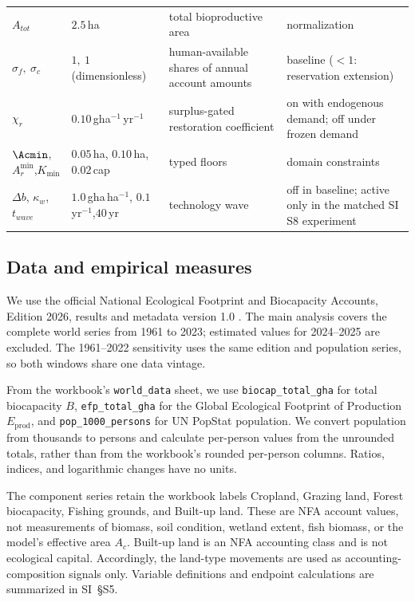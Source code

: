 \begin{table}[!htbp]
\begin{tabularx}{\textwidth}{@{}>{\raggedright\arraybackslash}p{} >{\raggedright\arraybackslash}p{} >{\raggedright\arraybackslash}X >{\raggedright\arraybackslash}p{}@{}}
$A_{tot}$ & $2.5$\,ha & total bioproductive area & normalization \\
$\sigma_f,\ \sigma_c$ & $1,\ 1$ (dimensionless) & human-available shares of annual account amounts & baseline ($<1$: reservation extension) \\
$\chi_r$ & $0.10$\,gha$^{-1}$\,yr$^{-1}$ & surplus-gated restoration coefficient & on with endogenous demand; off under frozen demand \\
$\Acmin$, $A_r^{\min}$,\newline $K_{\min}$ & $0.05$\,ha, $0.10$\,ha,\newline $0.02$\,cap & typed floors & domain constraints \\
$\Delta b$, $\kappa_w$,\newline $t_{wave}$ & $1.0$\,gha\,ha$^{-1}$, $0.1$\,yr$^{-1}$,\newline $40$\,yr & technology wave & off in baseline; active only in the matched SI S8 experiment \\
\bottomrule
\end{tabularx}
\end{table}

\subsection{Data and empirical measures}\label{sec:data}

We use the official National Ecological Footprint and Biocapacity Accounts, Edition 2026, results and metadata version 1.0 \citep{Lo2026NFA}. The main analysis covers the complete world series from 1961 to 2023; estimated values for 2024--2025 are excluded. The 1961--2022 sensitivity uses the same edition and population series, so both windows share one data vintage.

From the workbook's \texttt{world\_data} sheet, we use \texttt{biocap\_total\_gha} for total biocapacity $B$, \texttt{efp\_total\_gha} for the Global Ecological Footprint of Production $E_{\mathrm{prod}}$, and \texttt{pop\_1000\_persons} for UN PopStat population. We convert population from thousands to persons and calculate per-person values from the unrounded totals, rather than from the workbook's rounded per-person columns. Ratios, indices, and logarithmic changes have no units.

The component series retain the workbook labels Cropland, Grazing land, Forest biocapacity, Fishing grounds, and Built-up land. These are NFA account values, not measurements of biomass, soil condition, wetland extent, fish biomass, or the model's effective area $A_c$. Built-up land is an NFA accounting class and is not ecological capital. Accordingly, the land-type movements are used as accounting-composition signals only. Variable definitions and endpoint calculations are summarized in SI~\S S5.

